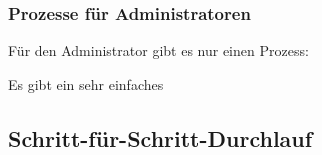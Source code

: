 \subsubsection{Prozesse für Administratoren}

Für den Administrator gibt es nur einen Prozess:

Es gibt ein sehr einfaches 

\subsection{Schritt-für-Schritt-Durchlauf}


 
